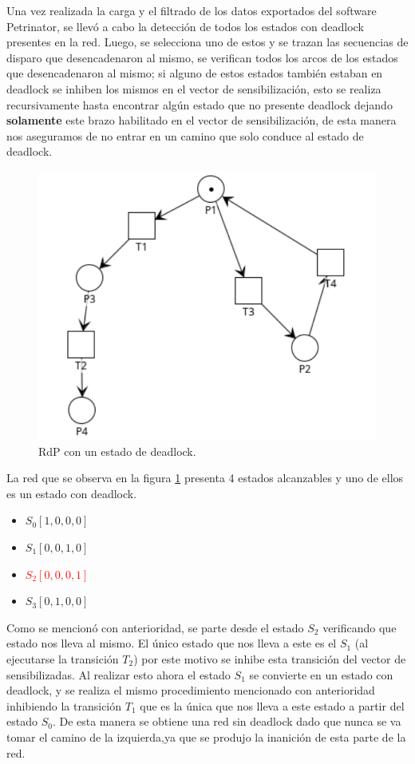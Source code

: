 Una vez realizada la carga y el filtrado de los datos exportados del software Petrinator, se llevó a cabo la detección de todos los estados con deadlock presentes en la red. Luego, se selecciona uno de estos y se trazan las secuencias de disparo que desencadenaron al mismo, se verifican todos los arcos de los estados que desencadenaron al mismo; si alguno de estos estados también estaban en deadlock se inhiben los mismos en el vector de sensibilización, esto se realiza recursivamente hasta encontrar algún estado que no presente deadlock dejando \textbf{solamente} este brazo habilitado en el vector de sensibilización, de esta manera nos aseguramos de no entrar en un camino que solo conduce al estado de deadlock.
\bigskip

\begin{figure}[H]
	\centering
	\includegraphics[scale=0.50]{Figures/algoritmo1/1.png}
	\caption{RdP con un estado de deadlock.}
	\label{fig:rdp3.1}
  \end{figure}

La red que se observa en la figura \ref{fig:rdp3.1} presenta 4 estados alcanzables y uno de ellos es un estado con deadlock.
\begin{itemize}
	\item $S_0[1,0,0,0]$
	\item $S_1[0,0,1,0]$
	\item \textcolor{red}{$S_2[0,0,0,1]$}
	\item $S_3[0,1,0,0]$
\end{itemize}
\bigskip

Como se mencionó con anterioridad, se parte desde el estado $S_2$ verificando que estado nos lleva al mismo. El único estado que nos lleva a este es el $S_1$ (al ejecutarse la transición $T_2$) por este motivo se inhibe esta transición del vector de sensibilizadas. Al realizar esto ahora el estado $S_1$ se convierte en un estado con deadlock, y se realiza el mismo procedimiento mencionado con anterioridad inhibiendo la transición $T_1$ que es la única que nos lleva a este estado a partir del estado $S_0$. 
De esta manera se obtiene una red sin deadlock dado que nunca se va tomar el camino de la izquierda,ya que se produjo la inanición de esta parte de la red.


